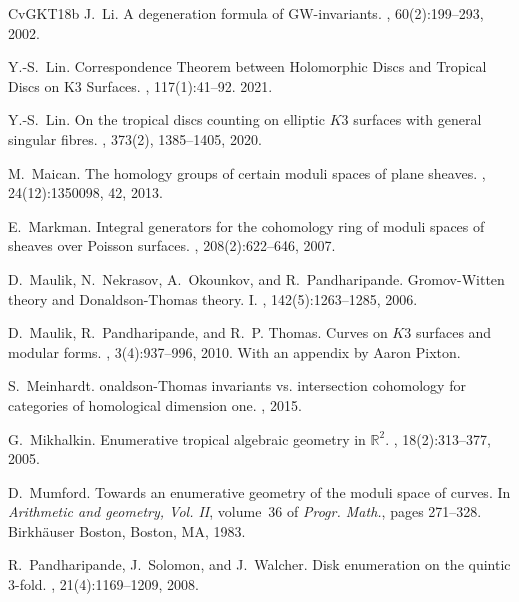 \documentclass[11pt,letterpaper]{amsart}
\begin{document}
\begin{thebibliography}{CvGKT18b}
J.~Li.
\newblock A degeneration formula of {GW}-invariants.
,
60(2):199--293, 2002.

Y.-S.~Lin.
\newblock Correspondence {T}heorem between {H}olomorphic {D}iscs and {T}ropical
  {D}iscs on {K3} {S}urfaces.
, 117(1):41--92. 2021.

Y.-S.~Lin.
\newblock On the tropical discs counting on elliptic {$K3$} surfaces with general singular fibres.
, 373(2), 1385--1405, 2020.


M.~Maican.
\newblock The homology groups of certain moduli spaces of plane sheaves.
, 24(12):1350098, 42, 2013.

E.~Markman.
\newblock Integral generators for the cohomology ring of moduli spaces of
  sheaves over {P}oisson surfaces.
, 208(2):622--646, 2007.


D.~Maulik, N.~Nekrasov, A.~Okounkov, and R.~Pandharipande.
\newblock Gromov-{W}itten theory and {D}onaldson-{T}homas theory. {I}.
, 142(5):1263--1285, 2006.

D.~Maulik, R.~Pandharipande, and R.~P. Thomas.
\newblock Curves on {$K3$} surfaces and modular forms.
, 3(4):937--996, 2010.
\newblock With an appendix by Aaron Pixton.


S.~Meinhardt.
onaldson-{T}homas invariants vs. intersection cohomology for
  categories of homological dimension one.
, 2015.

G.~Mikhalkin.
\newblock Enumerative tropical algebraic geometry in {$\mathbb{R}^2$}.
, 18(2):313--377, 2005.

D.~Mumford.
\newblock Towards an enumerative geometry of the moduli space of curves.
\newblock In {\em Arithmetic and geometry, {V}ol. {II}}, volume~36 of {\em
  Progr. Math.}, pages 271--328. Birkh\"auser Boston, Boston, MA, 1983.

R.~Pandharipande, J.~Solomon, and J.~Walcher.
\newblock Disk enumeration on the quintic 3-fold.
, 21(4):1169--1209, 2008.


\end{thebibliography}
\end{document}
